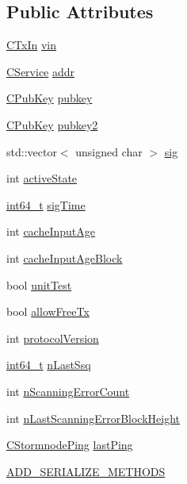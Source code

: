 \subsection*{Public Attributes}
\begin{DoxyCompactItemize}
\item 
\hyperlink{class_c_tx_in}{C\+Tx\+In} \hyperlink{class_c_stormnode_a62f5b0f436ca313afd612b07d687127f}{vin}
\item 
\hyperlink{class_c_service}{C\+Service} \hyperlink{class_c_stormnode_a31e0681a92d1f4d0da756b680c695d66}{addr}
\item 
\hyperlink{class_c_pub_key}{C\+Pub\+Key} \hyperlink{class_c_stormnode_af241ab789726de5ba5d2caba082c3d01}{pubkey}
\item 
\hyperlink{class_c_pub_key}{C\+Pub\+Key} \hyperlink{class_c_stormnode_a43efb713c0d8e8f01b9ea593e025856b}{pubkey2}
\item 
std\+::vector$<$ unsigned char $>$ \hyperlink{class_c_stormnode_a7484d9ff7d908f3610f6946aba19a7b3}{sig}
\item 
int \hyperlink{class_c_stormnode_a288aca8c8cbd786c2188ae5bc39c642a}{active\+State}
\item 
\hyperlink{stdint_8h_adec1df1b8b51cb32b77e5b86fff46471}{int64\+\_\+t} \hyperlink{class_c_stormnode_ae77544488795272ca9615ed1e23d3b77}{sig\+Time}
\item 
int \hyperlink{class_c_stormnode_a60687ff2b6a277680c6d39eeee997532}{cache\+Input\+Age}
\item 
int \hyperlink{class_c_stormnode_a80c11846fa792eb8466a37881b0c4954}{cache\+Input\+Age\+Block}
\item 
bool \hyperlink{class_c_stormnode_a7e879cd7e4f39560cc846c5127a58afa}{unit\+Test}
\item 
bool \hyperlink{class_c_stormnode_a1d256b346d4bee1e4d7a68db4c5e659f}{allow\+Free\+Tx}
\item 
int \hyperlink{class_c_stormnode_aa2baa2da552179c9812730d4d9709502}{protocol\+Version}
\item 
\hyperlink{stdint_8h_adec1df1b8b51cb32b77e5b86fff46471}{int64\+\_\+t} \hyperlink{class_c_stormnode_ac74bbfb73c657430dba45308a6f7a013}{n\+Last\+Ssq}
\item 
int \hyperlink{class_c_stormnode_a2f9e003508853f529c9ef70babe35fc0}{n\+Scanning\+Error\+Count}
\item 
int \hyperlink{class_c_stormnode_a632651553ac07fe57ceea55049eb430f}{n\+Last\+Scanning\+Error\+Block\+Height}
\item 
\hyperlink{class_c_stormnode_ping}{C\+Stormnode\+Ping} \hyperlink{class_c_stormnode_a506923ff67bd06fefba3a897828ce892}{last\+Ping}
\item 
\hyperlink{class_c_stormnode_a7dabb832beef5f761352a4799c55bbec}{A\+D\+D\+\_\+\+S\+E\+R\+I\+A\+L\+I\+Z\+E\+\_\+\+M\+E\+T\+H\+O\+D\+S}
\end{DoxyCompactItemize}
